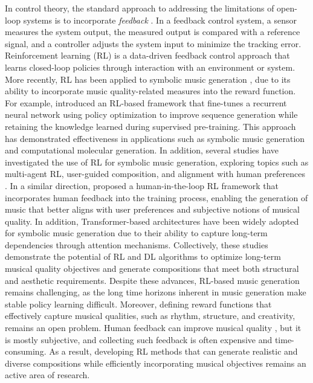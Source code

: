 \documentclass[letterpaper, 10 pt, conference]{ieeeconf}
\begin{document}
In control theory, the standard approach to addressing the limitations of open-loop systems is to incorporate \emph{feedback} \cite{Astrom2008}. In a feedback control system, a sensor measures the system output, the measured output is compared with a reference signal, and a controller adjusts the system input to minimize the tracking error.
Reinforcement learning (RL) is a data-driven feedback control approach that learns closed-loop policies through interaction with an environment or system. More recently, RL has been applied to symbolic music generation \cite{Jaques2016,Kotecha2018,dadman2023,dadman2024,cideron2024,Justus2023}, due to its ability to incorporate music quality-related measures into the reward function. For example, \cite{Jaques2016} introduced an RL-based framework that fine-tunes a recurrent neural network using policy optimization to improve sequence generation while retaining the knowledge learned during supervised pre-training. This approach has demonstrated effectiveness in applications such as symbolic music generation and computational molecular generation.  In addition, several studies have investigated the use of RL for symbolic music generation, exploring topics such as multi-agent RL, user-guided composition, and alignment with human preferences \cite{Kotecha2018,dadman2023,dadman2024,cideron2024}. In a similar direction, \cite{Justus2023} proposed a human-in-the-loop RL framework that incorporates human feedback into the training process, enabling the generation of music that better aligns with user preferences and subjective notions of musical quality. In addition, Transformer-based architectures have been widely adopted for symbolic music generation \cite{Huang2018,Ens2020,Shih2022,Yu2022,Wu2023,Copet2024} due to their ability to capture long-term dependencies through attention mechanisms. Collectively, these studies demonstrate the potential of RL and DL algorithms to optimize long-term musical quality objectives and generate compositions that meet both structural and aesthetic requirements.   Despite these advances, RL-based music generation remains challenging, as the long time horizons inherent in music generation make stable policy learning difficult. Moreover, defining reward functions that effectively capture musical qualities, such as rhythm, structure, and creativity, remains an open problem.  Human feedback can improve musical quality \cite{dadman2024,cideron2024,Justus2023}, but it is mostly subjective, and collecting such feedback is often expensive and time-consuming. As a result, developing RL methods that can generate realistic and diverse compositions while efficiently incorporating musical objectives remains an active area of research.
\end{document}
